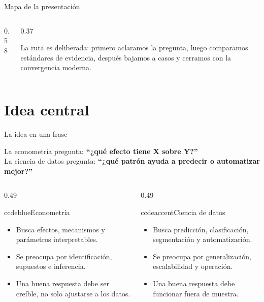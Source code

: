 \documentclass[aspectratio=169,11pt,table]{beamer}
\begin{document}
\begin{frame}{Mapa de la presentación}
\begin{columns}[T,onlytextwidth]
\begin{column}{0.58\textwidth}
\tableofcontents
\end{column}
\begin{column}{0.37\textwidth}
\begin{keybox}
\small
La ruta es deliberada: primero aclaramos la pregunta, luego comparamos estándares de evidencia, después bajamos a casos y cerramos con la convergencia moderna.
\end{keybox}
\end{column}
\end{columns}
\end{frame}

\section{Idea central}

\begin{frame}{La idea en una frase}
\begin{keybox}
\centering
\large
La econometría pregunta: \textbf{``¿qué efecto tiene X sobre Y?''}\\[0.45em]
La ciencia de datos pregunta: \textbf{``¿qué patrón ayuda a predecir o automatizar mejor?''}
\end{keybox}

\vspace{0.22cm}
\begin{columns}[T,onlytextwidth]
\begin{column}{0.49\textwidth}
\begin{contrastbox}{ccdeblue}{Econometría}
\small
\begin{itemize}
  \item Busca efectos, mecanismos y parámetros interpretables.
  \item Se preocupa por identificación, supuestos e inferencia.
  \item Una buena respuesta debe ser creíble, no solo ajustarse a los datos.
\end{itemize}
\end{contrastbox}
\end{column}
\begin{column}{0.49\textwidth}
\begin{contrastbox}{ccdeaccent}{Ciencia de datos}
\small
\begin{itemize}
  \item Busca predicción, clasificación, segmentación y automatización.
  \item Se preocupa por generalización, escalabilidad y operación.
  \item Una buena respuesta debe funcionar fuera de muestra.
\end{itemize}
\end{contrastbox}
\end{column}
\end{columns}

\end{frame}
\end{document}
